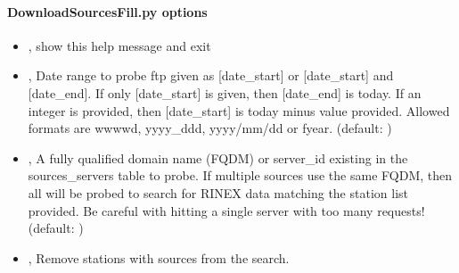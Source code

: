 \documentclass[letterpaper,10pt,english]{sphinxmanual}
\begin{document}
\paragraph{DownloadSourcesFill.py options}
\label{\detokenize{com:DownloadSourcesFill.py-options}}\begin{itemize}
\item {} 
\sphinxAtStartPar
{\hyperref[\detokenize{com:DownloadSourcesFill.py--h}]{}}, {\hyperref[\detokenize{com:DownloadSourcesFill.py---help}]{}} \sphinxhyphen{} show this help message and exit

\item {} 
\sphinxAtStartPar
{\hyperref[\detokenize{com:DownloadSourcesFill.py--date}]{}} , {\hyperref[\detokenize{com:DownloadSourcesFill.py---date_range}]{}}  \sphinxhyphen{} Date range to probe ftp given as {[}date\_start{]} or {[}date\_start{]} and {[}date\_end{]}. If only {[}date\_start{]} is given, then {[}date\_end{]} is today. If an integer is provided, then {[}date\_start{]} is today minus value provided. Allowed formats are wwww\sphinxhyphen{}d, yyyy\_ddd, yyyy/mm/dd or fyear. (default: )

\item {} 
\sphinxAtStartPar
{\hyperref[\detokenize{com:DownloadSourcesFill.py--source}]{}} , {\hyperref[\detokenize{com:DownloadSourcesFill.py---data_source}]{}}  \sphinxhyphen{} A fully qualified domain name (FQDM) or server\_id existing in the sources\_servers table to probe. If multiple sources use the same FQDM, then all will be probed to search for RINEX data matching the station list provided. Be careful with hitting a single server with too many requests! (default: )

\item {} 
\sphinxAtStartPar
{\hyperref[\detokenize{com:DownloadSourcesFill.py--skip}]{}}, {\hyperref[\detokenize{com:DownloadSourcesFill.py---skip_stations_with_source}]{}} \sphinxhyphen{} Remove stations with sources from the search.


\end{itemize}
\end{document}

